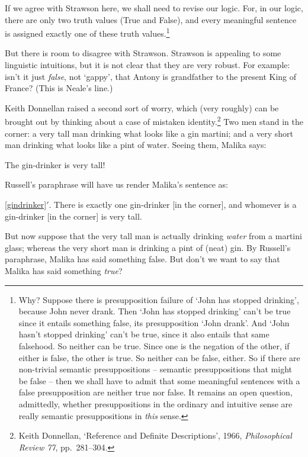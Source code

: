 If we agree with Strawson here,  we shall need to revise our logic. For, in our logic, there are only two truth values (True and False), and every meaningful sentence is assigned exactly one of these truth values.\footnote{Why? Suppose there is presupposition failure of `John has stopped drinking', because John never drank. Then `John has stopped drinking' can't be true since it entails something false, its presupposition `John drank'. And `John hasn't stopped drinking' can't be true, since it also entails that same falsehood. So neither can be true. Since one is the negation of the other, if either is false, the other is true. So neither can be false, either. So if there are non-trivial semantic presuppositions – semantic presuppositions that might be false – then we shall have to admit that some meaningful sentences with a false presupposition are neither true nor false. It remains an open question, admittedly, whether presuppositions in the ordinary and intuitive sense are really semantic presuppositions in \emph{this} sense.} 

But there is room to disagree with Strawson. Strawson is appealing to some linguistic intuitions, but it is not clear that they are very robust. For example: isn't it just \emph{false}, not `gappy', that Antony is grandfather to the present King of France? (This is Neale's line.)

Keith Donnellan raised a second sort of worry, which (very roughly) can be brought out by thinking about a case of mistaken identity.\footnote{Keith Donnellan, `Reference and Definite Descriptions', 1966, \emph{Philosophical Review 77}, pp.\ 281–304.} Two men stand in the corner: a very tall man drinking what looks like a gin martini; and a very short man drinking what looks like a pint of water. Seeing them, Malika says:
	\begin{earg}
		\item[\ex{gindrinker}] The gin-drinker is very tall!
	\end{earg}
Russell's paraphrase will have us render Malika's sentence as:
	\begin{earg}
		\item[\ref{gindrinker}$'$.] There is exactly one gin-drinker [in the corner], and whomever is a gin-drinker [in the corner] is very tall.
	\end{earg}
But now suppose that the very tall man is actually drinking \emph{water} from a martini glass; whereas the very short man is drinking a pint of (neat) gin. By Russell's paraphrase, Malika has said something false. But don't we want to say that Malika has said something \emph{true}? 

